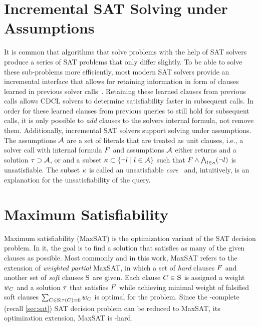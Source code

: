 \section{Incremental SAT Solving under Assumptions\label{sec:inc-sat}}

It is common that algorithms that solve problems with the help of SAT solvers produce a series of SAT problems that only differ slightly.
To be able to solve these sub-problems more efficiently, most modern SAT solvers provide an incremental interface that allows for retaining information in form of clauses learned in previous solver calls~\autocites{DBLP:journals/entcs/EenS03,handbook2-cdcl}.
Retaining these learned clauses from previous calls allows CDCL solvers to determine satisfiability faster in subsequent calls.
In order for these learned clauses from previous queries to still hold for subsequent calls, it is only possible to \emph{add} clauses to the solvers internal formula, not remove them.
Additionally, incremental SAT solvers support solving under assumptions.
The assumptions $\mathcal{A}$ are a set of literals that are treated as unit clauses, i.e., a solver call with internal formula $F$ and assumptions $\mathcal{A}$ either returns \sat{} and a solution $\tau \supset \mathcal{A}$, or \unsat{} and a subset $\kappa \subset \{\lnot l \mid l\in\mathcal{A}\}$ such that $F \land \bigwedge_{l \in \kappa} (\lnot l)$ is unsatisfiable.
The subset $\kappa$ is called an unsatisfiable \emph{core}~\autocite{handbook2-cdcl} and, intuitively, is an explanation for the unsatisfiability of the query.

\section{Maximum Satisfiability\label{sec:max-sat}}

Maximum satisfiability (MaxSAT) is the optimization variant of the SAT decision problem.
In it, the goal is to find a solution that satisfies as many of the given clauses as possible.
Most commonly and in this work, MaxSAT refers to the extension of \emph{weighted partial} MaxSAT, in which a set of \emph{hard} clauses $F$ and another set of \emph{soft} clauses $\textsc{S}$ are given.
Each clause $C \in \textsc{S}$ is assigned a weight $w_C$ and a solution $\tau$ that satisfies $F$ while achieving minimal weight of falsified soft clauses $\sum_{C\in\textsc{S} \mid \tau(C)=0} w_C$ is optimal for the problem.
Since the \NP-complete (recall \cref{sec:sat}) SAT decision problem can be reduced to MaxSAT, its optimization extension, MaxSAT is \NP-hard.

